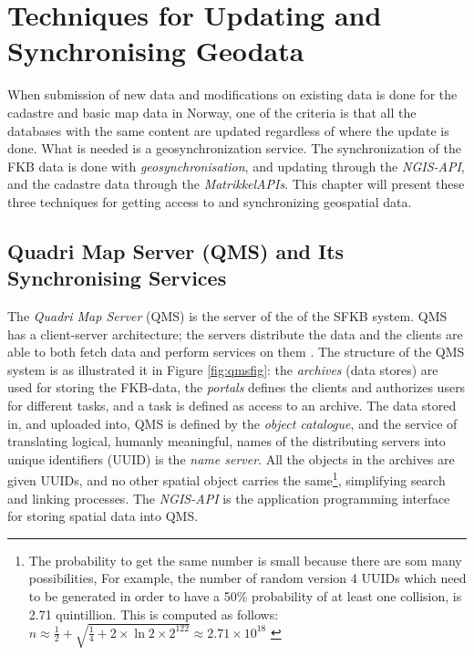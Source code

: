 \chapter{Techniques for Updating and Synchronising Geodata} \label{chap:tech}
When submission of new data and modifications on existing data is done for the cadastre and basic map data in Norway, one of the criteria is that all the databases with the same content are updated regardless of where the update is done. What is needed is a geosynchronization service. The synchronization of the FKB data is done with \textit{geosynchronisation}, and updating through the \textit{NGIS-API}, and the cadastre data through the \textit{MatrikkelAPIs}.  This chapter will present these three techniques for getting access to and synchronizing geospatial data.  


\section{Quadri Map Server (QMS) and Its Synchronising Services}\label{ngis}
The \textit{Quadri Map Server} (QMS) is the server of the of the SFKB system. 
QMS has a client-server architecture; the servers distribute the data and the clients are able to both fetch data and perform services on them \citep{NorkartAS2010}. 
The structure of the QMS system
is as \cite{Kartverket2017} illustrated it in Figure \ref{fig:qmsfig}: the \textit{archives} (data stores) are used for storing the FKB-data, the \textit{portals} defines the clients and authorizes users for different tasks, and a task is defined as access to an archive. The data stored in, and uploaded into, QMS is defined by the \textit{object catalogue}, and the service of translating logical, humanly meaningful, names of the distributing servers into unique identifiers (UUID) is the \textit{name server}. All the objects in the archives are given UUIDs, and no other spatial object carries the same\footnote{The probability to get the same number is small because there are som many possibilities, For example, the number of random version 4 UUIDs which need to be generated in order to have a 50\% probability of at least one collision, is 2.71 quintillion. This is computed as follows: $ n \approx \frac{1}{2} + \sqrt{\frac{1}{4}+2 \times \ln{2} \times  2^{122}} \approx 2.71 \times 10^{18} $ \citep{Eggan2017}}, simplifying search and linking processes.
The \textit{NGIS-API} is the application programming interface for storing spatial data into QMS.%

